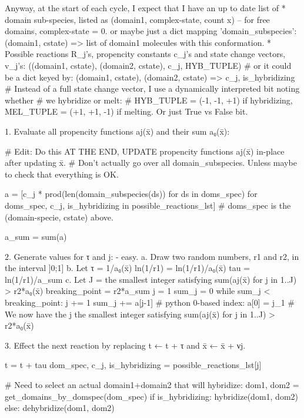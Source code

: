     Anyway, at the start of each cycle, I expect that I have an up to date list of
        * domain sub-species, listed as
            (domain1, complex-state, count x)  -- for free domains, complex-state = 0.
          or maybe just a dict mapping 'domain_subspecies':
            (domain1, cstate) => list of domain1 molecules with this conformation.
        * Possible reactions R_j's, propencity constants c_j's and state change vectors, v_j's:
            ({(domain1, cstate), (domain2, cstate)}, c_j, HYB_TUPLE)
            # or it could be a dict keyed by:
                {(domain1, cstate), (domain2, cstate)} => c_j, is_hybridizing
            # Instead of a full state change vector, I use a dynamically interpreted bit noting whether
            # we hybridize or melt:
            # HYB_TUPLE = (-1, -1, +1) if hybridizing, MEL_TUPLE = (+1, +1, -1) if melting. Or just True vs False bit.

    1. Evaluate all propencity functions aj(x̄) and their sum a₀(x̄):

    # Edit: Do this AT THE END, UPDATE propencity functions aj(x̄) in-place after updating x̄.
    # Don't actually go over all domain_subspecies. Unless maybe to check that everything is OK.

        a = [c_j * prod(len(domain_subspecies(ds)) for ds in doms_spec)
             for doms_spec, c_j, is_hybridizing in possible_reactions_lst]  # doms_spec is the (domain-specie, cstate) above.

        a_sum = sum(a)

    2. Generate values for τ and j:  - easy.
        a. Draw two random numbers, r1 and r2, in the interval ]0;1]
        b. Let τ = 1/a₀(x̄) ln(1/r1) = ln(1/r1)/a₀(x̄)
            tau = ln(1/r1)/a_sum
        c. Let J = the smallest integer satisfying sum(aj(x̄) for j in 1..J) > r2*a₀(x̄)
            breaking_point = r2*a_sum
            j = 1
            sum_j = 0
            while sum_j < breaking_point:
                j += 1
                sum_j += a[j-1]   # python 0-based index: a[0] = j_1
            # We now have the j the smallest integer satisfying sum(aj(x̄) for j in 1..J) > r2*a₀(x̄)

    3. Effect the next reaction by replacing t ← t + τ and x̄ ← x̄ + νj.

        t = t + tau
        dom_spec, c_j, is_hybridizing = possible_reactions_lst[j]

        # Need to select an actual domain1+domain2 that will hybridize:
        dom1, dom2 = get_domains_by_domspec(dom_spec)
        if is_hybridizing:
            hybridize(dom1, dom2)
        else:
            dehybridize(dom1, dom2)

